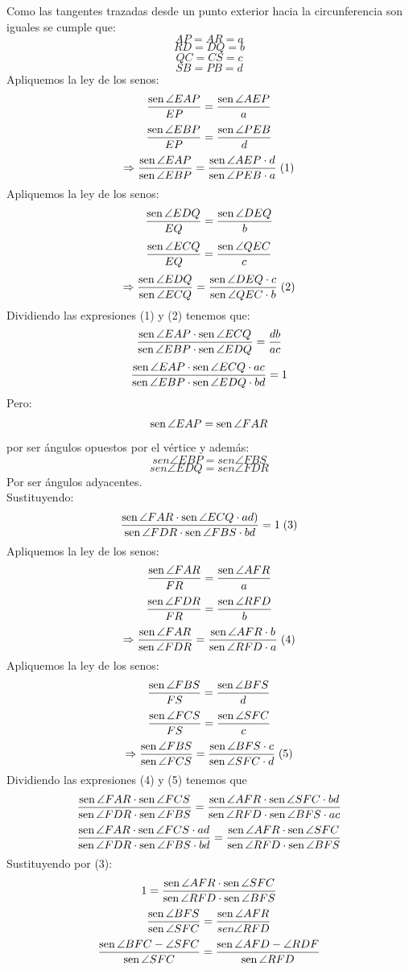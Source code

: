 \documentclass{book}
\newcommand{\sen}{\mathop{\rm sen}\nolimits} %
\begin{document}
\begin{enumerate}
\begin{center}
					\end{center}
					Como las tangentes trazadas desde un punto exterior hacia la circunferencia son iguales se cumple que:
$$AP=AR=a$$
$$RD=DQ=b$$
$$QC=CS=c$$
$$SB=PB=d$$
Apliquemos la ley de los senos:
$${\sen {\angle EAP}\over EP}={\sen {\angle AEP}\over a}$$
$${\sen {\angle EBP}\over EP}={\sen {\angle PEB}\over d}$$
$$\Rightarrow\frac{\sen {\angle EAP}}{\sen {\angle EBP}}=\frac{\sen {\angle AEP}\cdot d}{\sen {\angle PEB}\cdot a}\;(1)$$
Apliquemos la ley de los senos:
$${\sen {\angle EDQ}\over EQ}={\sen {\angle DEQ}\over b}$$
$${\sen {\angle ECQ}\over EQ}={\sen {\angle QEC}\over c}$$
$$\Rightarrow{\sen {\angle EDQ}\over\sen {\angle ECQ}}={\sen {\angle DEQ}\cdot c\over\sen {\angle QEC}\cdot b}\;  (2)$$
Dividiendo las expresiones (1) y (2) tenemos que:
$$\frac{\sen {\angle EAP}\cdot\sen {\angle ECQ}}{\sen {\angle EBP}\cdot\sen {\angle EDQ}}={db\over ac}  $$
$$\frac{\sen {\angle EAP}\cdot\sen {\angle ECQ}\cdot ac}{\sen {\angle EBP}\cdot\sen {\angle EDQ}\cdot bd}=1$$
Pero:
$$\sen {\angle EAP}=\sen {\angle FAR}$$
por ser ángulos opuestos por el vértice y además:
$$sen {\angle EBP}=sen {\angle FBS}$$
$$sen {\angle EDQ}=sen {\angle FDR}$$
Por ser ángulos adyacentes.\\
Sustituyendo:
$$\frac{\sen {\angle FAR}\cdot\sen {\angle ECQ}\cdot ad)}{\sen {\angle FDR}\cdot\sen {\angle FBS}\cdot bd}=1\; (3)$$
Apliquemos la ley de los senos:
$${\sen {\angle FAR}\over FR}={\sen {\angle AFR}\over a}$$
$${\sen {\angle FDR}\over FR}={\sen {\angle RFD}\over b}$$
$$\Rightarrow\frac{\sen {\angle FAR}}{\sen {\angle FDR}}=\frac{\sen {\angle AFR}\cdot b}{\sen {\angle RFD}\cdot a}\;(4)$$
Apliquemos la ley de los senos:
$${\sen {\angle FBS}\over FS}={\sen {\angle BFS}\over d}$$
$${\sen {\angle FCS}\over FS}={\sen {\angle SFC}\over c}$$
$$\Rightarrow\frac{\sen {\angle FBS}}{\sen {\angle FCS}}=\frac{\sen {\angle BFS}\cdot c}{\sen {\angle SFC}\cdot d}\;(5)$$
Dividiendo las expresiones (4) y (5) tenemos que
$$\frac{\sen {\angle FAR}\cdot\sen {\angle FCS}}{\sen {\angle FDR}\cdot\sen {\angle FBS}}=\frac{\sen {\angle AFR}\cdot\sen {\angle SFC}\cdot bd}{\sen {\angle RFD}\cdot\sen {\angle BFS}\cdot ac}$$
$$\frac{\sen {\angle FAR}\cdot\sen {\angle FCS}\cdot ad}{\sen {\angle FDR}\cdot\sen {\angle FBS}\cdot bd}=\frac{\sen {\angle AFR}\cdot\sen {\angle SFC}}{\sen {\angle RFD}\cdot\sen {\angle BFS}}$$
Sustituyendo por (3):
$$1=\frac{\sen {\angle AFR}\cdot\sen {\angle SFC}}{\sen {\angle RFD}\cdot\sen {\angle BFS}}$$
$$\frac{\sen {\angle BFS}}{\sen {\angle SFC}}=\frac{\sen {\angle AFR}}{
sen {\angle RFD}}$$
$$\frac{\sen {\angle BFC-\angle SFC}}{\sen {\angle SFC}}=\frac{\sen {\angle AFD-\angle RDF}}{\sen {\angle RFD}}$$

\end{enumerate}
\end{document}
